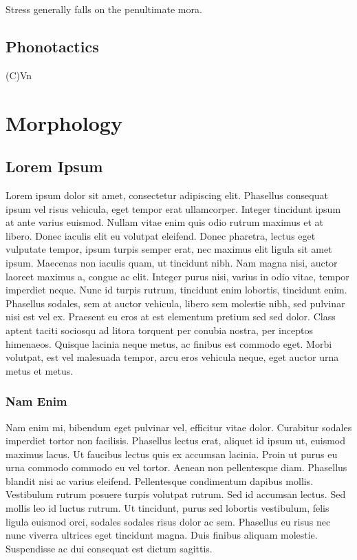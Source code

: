 \documentclass{clgrammar}
\begin{document}
Stress generally falls on the penultimate mora.

\section{Phonotactics}

(C)Vn

\chapter{Morphology}



\section{Lorem Ipsum}
Lorem ipsum dolor sit amet, consectetur adipiscing elit. Phasellus consequat ipsum vel risus vehicula, eget tempor erat ullamcorper. Integer tincidunt ipsum at ante varius euismod. Nullam vitae enim quis odio rutrum maximus et at libero. Donec iaculis elit eu volutpat eleifend. Donec pharetra, lectus eget vulputate tempor, ipsum turpis semper erat, nec maximus elit ligula sit amet ipsum. Maecenas non iaculis quam, ut tincidunt nibh. Nam magna nisi, auctor laoreet maximus a, congue ac elit. Integer purus nisi, varius in odio vitae, tempor imperdiet neque. Nunc id turpis rutrum, tincidunt enim lobortis, tincidunt enim. Phasellus sodales, sem at auctor vehicula, libero sem molestie nibh, sed pulvinar nisi est vel ex. Praesent eu eros at est elementum pretium sed sed dolor. Class aptent taciti sociosqu ad litora torquent per conubia nostra, per inceptos himenaeos. Quisque lacinia neque metus, ac finibus est commodo eget. Morbi volutpat, est vel malesuada tempor, arcu eros vehicula neque, eget auctor urna metus et metus.

\subsection{Nam Enim}
Nam enim mi, bibendum eget pulvinar vel, efficitur vitae dolor. Curabitur sodales imperdiet tortor non facilisis. Phasellus lectus erat, aliquet id ipsum ut, euismod maximus lacus. Ut faucibus lectus quis ex accumsan lacinia. Proin ut purus eu urna commodo commodo eu vel tortor. Aenean non pellentesque diam. Phasellus blandit nisi ac varius eleifend. Pellentesque condimentum dapibus mollis. Vestibulum rutrum posuere turpis volutpat rutrum. Sed id accumsan lectus. Sed mollis leo id luctus rutrum. Ut tincidunt, purus sed lobortis vestibulum, felis ligula euismod orci, sodales sodales risus dolor ac sem. Phasellus eu risus nec nunc viverra ultrices eget tincidunt magna. Duis finibus aliquam molestie. Suspendisse ac dui consequat est dictum sagittis.
\end{document}
